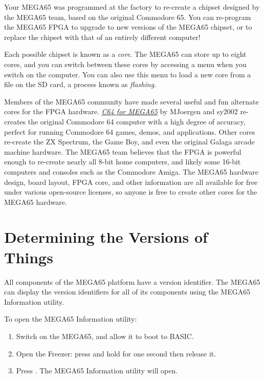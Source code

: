 Your MEGA65 was programmed at the factory to re-create a chipset designed by the MEGA65 team, based on the original Commodore 65. You can re-program the MEGA65 FPGA to upgrade to new versions of the MEGA65 chipset, or to replace the chipset with that of an entirely different computer!

Each possible chipset is known as a {\em core}. The MEGA65 can store up to eight cores, and you can switch between these cores by accessing a menu when you switch on the computer. You can also use this menu to load a new core from a file on the SD card, a process known as {\em flashing}.

Members of the MEGA65 community have made several useful and fun alternate cores for the FPGA hardware. \href{https://github.com/MJoergen/C64MEGA65}{{\em C64 for MEGA65}} by MJoergen and sy2002 re-creates the original Commodore 64 computer with a high degree of accuracy, perfect for running Commodore 64 games, demos, and applications. Other cores re-create the ZX Spectrum, the Game Boy, and even the original Galaga arcade machine hardware. The MEGA65 team believes that the FPGA is powerful enough to re-create nearly all 8-bit home computers, and likely some 16-bit computers and consoles such as the Commodore Amiga. The MEGA65 hardware design, board layout, FPGA core, and other information are all available for free under various open-source licenses, so anyone is free to create other cores for the MEGA65 hardware.

\section{Determining the Versions of Things}
\label{sec:versions}

All components of the MEGA65 platform have a version identifier. The MEGA65 can display the version identifiers for all of its components using the MEGA65 Information utility.

To open the MEGA65 Information utility:

\begin{enumerate}
  \item Switch on the MEGA65, and allow it to boot to BASIC.
  \item Open the Freezer: press and hold  for one second then release it.
  \item Press . The MEGA65 Information utility will open.
\end{enumerate}

